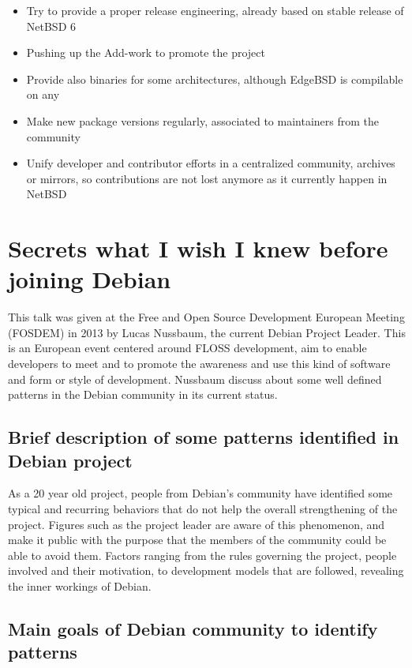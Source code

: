 \documentclass[11pt]{article} %
\begin{document}
\begin{itemize}
	\item Try to provide a proper release engineering, already based on stable release of NetBSD 6
	\item Pushing up the Add-work to promote the project
	\item Provide also binaries for some architectures, although EdgeBSD is compilable on any
	\item Make new package versions regularly, associated to maintainers from the community
	\item Unify developer and contributor efforts in a centralized community, archives or mirrors, so contributions are not lost anymore as it currently happen in NetBSD
\end{itemize}


\section{Secrets what I wish I knew before joining Debian}

This talk was given at the Free and Open Source Development European Meeting (FOSDEM) in 2013 by Lucas Nussbaum, the current Debian Project Leader. This is an European event centered around FLOSS development, aim to enable developers to meet and to promote the awareness and use this kind of software and form or style of development. Nussbaum discuss about some well defined patterns in the Debian community in its current status.

\subsection{Brief description of some patterns identified in Debian project}

As a 20 year old project, people from Debian's community have identified some typical and recurring behaviors that do not help the overall strengthening of the project. Figures such as the project leader are aware of this phenomenon, and make it public with the purpose that the members of the community could be able to avoid them. Factors ranging from the rules governing the project, people involved and their motivation, to development models that are followed, revealing the inner workings of Debian.

\subsection{Main goals of Debian community to identify patterns}
\end{document}
